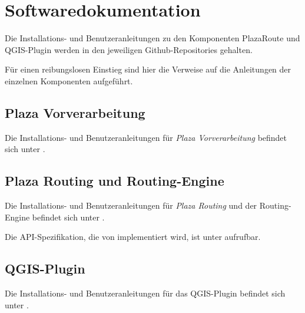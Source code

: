 \section{Softwaredokumentation}
\label{sec:Softwaredokumentation}

Die Installations- und Benutzeranleitungen zu den Komponenten PlazaRoute und QGIS-Plugin werden in den jeweiligen Github-Repositories \cite{github:PlazaRoute} \cite{github:PlazaRoute-qgis-plugin} gehalten. 

Für einen reibungslosen Einstieg sind hier die Verweise auf die Anleitungen der einzelnen Komponenten aufgeführt.

\subsection{Plaza Vorverarbeitung}
\label{Softwaredokumentation:Plaza Vorverarbeitung}

Die Installations- und Benutzeranleitungen für \emph{Plaza Vorverarbeitung} befindet sich unter \cite{github:plaza_preprocessing_readme}.

\subsection{Plaza Routing und Routing-Engine}
\label{Softwaredokumentation:Plaza Routing}

Die Installations- und Benutzeranleitungen für \emph{Plaza Routing} und der Routing-Engine befindet sich unter \cite{github:plaza_routing_readme}.

Die \ac{API}-Spezifikation, die von  implementiert wird, ist unter \cite{plaza-routing-api-spez} aufrufbar.

\subsection{QGIS-Plugin}
\label{Softwaredokumentation:QGIS-Plugin}

Die Installations- und Benutzeranleitungen für das QGIS-Plugin befindet sich unter \cite{github:PlazaRoute-qgis-plugin}.
